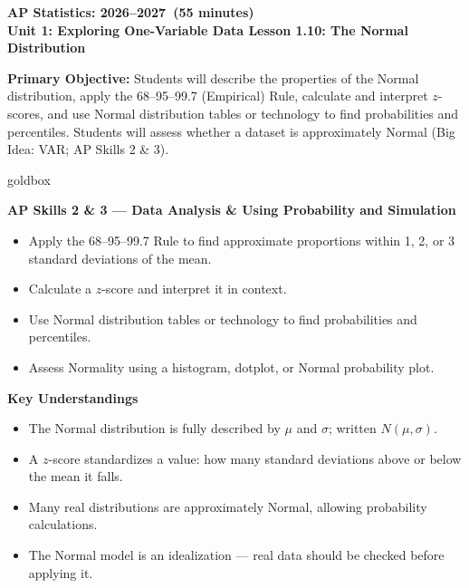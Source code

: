\documentclass[10pt]{article}
\begin{document}
\def\CourseName{AP Statistics}
\def\SchoolYear{2026--2027}
\def\MeetingLength{55 minutes}
\def\UnitNumberName{Unit 1: Exploring One-Variable Data \quad}
\def\LessonNumberName{Lesson 1.10: The Normal Distribution}

\begin{center}
    {\Large\bfseries \CourseName: \SchoolYear\ (\MeetingLength) \\
    {\small\bfseries \UnitNumberName \LessonNumberName}}
\end{center}

\begin{tcolorbox}[colback=sky,colframe=navy,boxrule=0.9pt,arc=2mm,
    left=2mm,right=2mm,top=1.5mm,bottom=1.5mm]
    \textbf{Primary Objective:} Students will describe the properties of the Normal distribution,
    apply the 68--95--99.7 (Empirical) Rule, calculate and interpret $z$-scores, and use Normal
    distribution tables or technology to find probabilities and percentiles. Students will assess
    whether a dataset is approximately Normal (Big Idea: VAR; AP Skills 2 \& 3).
\end{tcolorbox}

\begin{skillbox}{goldbox}
\begin{minipage}[t]{0.48\linewidth}
    \textbf{AP Skills 2 \& 3 --- Data Analysis \& Using Probability and Simulation}
    \begin{itemize}
        \item Apply the 68--95--99.7 Rule to find approximate proportions within 1, 2, or 3 standard deviations of the mean.
        \item Calculate a $z$-score and interpret it in context.
        \item Use Normal distribution tables or technology to find probabilities and percentiles.
        \item Assess Normality using a histogram, dotplot, or Normal probability plot.
    \end{itemize}
\end{minipage}
\hfill
\begin{minipage}[t]{0.48\linewidth}
    \textbf{Key Understandings}
    \begin{itemize}
        \item The Normal distribution is fully described by $\mu$ and $\sigma$; written $N(\mu, \sigma)$.
        \item A $z$-score standardizes a value: how many standard deviations above or below the mean it falls.
        \item Many real distributions are approximately Normal, allowing probability calculations.
        \item The Normal model is an idealization --- real data should be checked before applying it.
    \end{itemize}
\end{minipage}
\end{skillbox}
\end{document}
